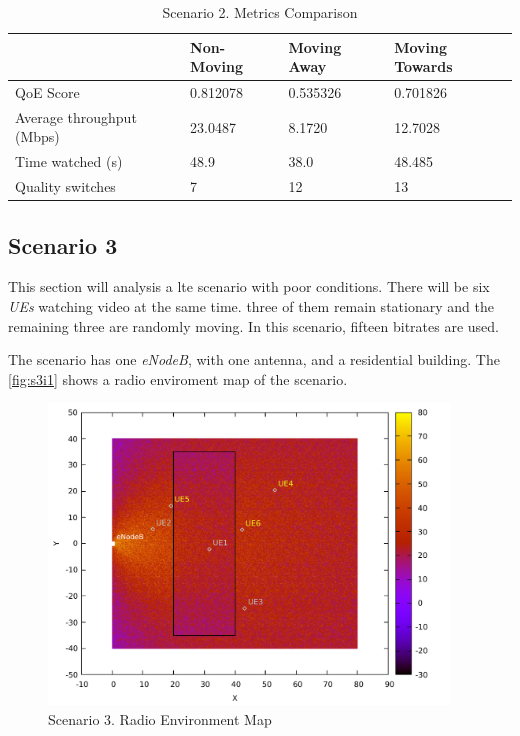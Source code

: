 \begin{table}[]
    \centering
    \begin{tabular}{@{}llll@{}}
    \toprule
                              & Non-Moving & Moving Away & Moving Towards \\ \midrule
    QoE Score                 & 0.812078   & 0.535326    & 0.701826       \\
    Average throughput (Mbps) & 23.0487    & 8.1720      & 12.7028        \\
    Time watched (s)          & 48.9       & 38.0        & 48.485         \\
    Quality switches          & 7          & 12          & 13             \\ \bottomrule
    \end{tabular}
    \caption{Scenario 2. Metrics Comparison}
    \label{table:s2t1}
\end{table}



\subsection{Scenario 3}

This section will analysis a lte scenario with poor conditions. There will be six \textit{UEs} watching video at the same time.
three of them remain stationary and the remaining three are randomly moving.
In this scenario, fifteen bitrates are used.

The scenario has one \textit{eNodeB}, with one antenna, and a residential building. The 
\autoref{fig:s3i1} shows a radio enviroment map of the scenario.

\begin{figure}[h]
    \centering
    \includegraphics[width=0.95\textwidth]{img/s3i1.pdf}
    \caption{Scenario 3. Radio Environment Map}
    \label{fig:s3i1}
\end{figure}

